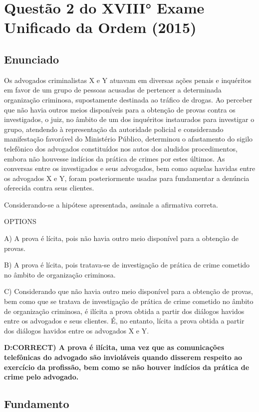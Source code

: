 \documentclass[12pt]{article}
\begin{document}
\section{Questão 2 do XVIII° Exame Unificado da Ordem (2015)}

\subsection{Enunciado}
Os advogados criminalistas X e Y atuavam em diversas ações 
penais e inquéritos em favor de um grupo de pessoas 
acusadas de pertencer a determinada organização criminosa, 
supostamente destinada ao tráfico de drogas. Ao perceber 
que não havia outros meios disponíveis para a obtenção de 
provas contra os investigados, o juiz, no âmbito de um dos 
inquéritos instaurados para investigar o grupo, atendendo à 
representação da autoridade policial e considerando 
manifestação favorável do Ministério Público, determinou o 
afastamento do sigilo telefônico dos advogados constituídos 
nos autos dos aludidos procedimentos, embora não houvesse 
indícios da prática de crimes por estes últimos. As conversas 
entre os investigados e seus advogados, bem como aquelas 
havidas entre os advogados X e Y, foram posteriormente 
usadas para fundamentar a denúncia oferecida contra seus 
clientes. 

Considerando-se a hipótese apresentada, assinale a afirmativa 
correta. 
 
OPTIONS

A) A prova é lícita, pois não havia outro meio disponível para a obtenção de provas. 

B) A prova é lícita, pois tratava-se de investigação de prática de crime cometido no âmbito de organização criminosa. 

C) Considerando que não havia outro meio disponível para a 
obtenção de provas, bem como que se tratava de 
investigação de prática de crime cometido no âmbito de 
organização criminosa, é ilícita a prova obtida a partir dos 
diálogos havidos entre os advogados e seus clientes. É, no 
entanto, lícita a prova obtida a partir dos diálogos havidos 
entre os advogados X e Y. 

\textbf{D:CORRECT) A prova é ilícita, uma vez que as comunicações telefônicas do advogado são invioláveis quando disserem respeito ao exercício da profissão, bem como se não houver indícios da prática de crime pelo advogado.} 

\subsection{Fundamento}
\end{document}
